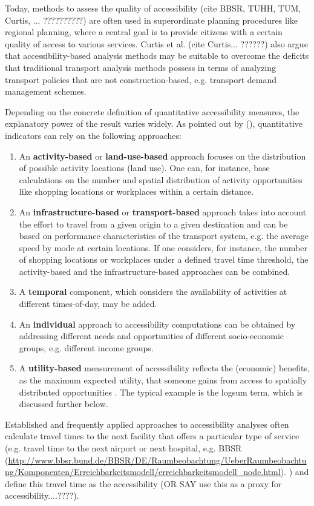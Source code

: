 Today, methods to assess the quality of accessibility (cite BBSR, TUHH, TUM, Curtis, ... ??????????) are often used in superordinate planning procedures like regional planning, where a central goal is to provide citizens with a certain quality of access to various services. Curtis et al. (cite Curtis... ??????) also argue that accessibility-based analysis methods may be suitable to overcome the deficits that traditional transport analysis methods possess in terms of analyzing transport policies that are not construction-based, e.g. transport demand management schemes.

Depending on the concrete definition of quantitative accessibility measures, the explanatory power of the result varies widely. As pointed out by \citet{GeursRitsema2001AccessibilityMeasures} (\citep[see also][]{Geurs2004AccessibilityReview}), quantitative indicators can rely on the following approaches:
%
\begin{enumerate}
\item An \textbf{activity-based} or \textbf{land-use-based} approach focuses on
the distribution of possible activity locations (land use). One can, for instance,
base calculations on the number and spatial distribution of activity opportunities
like shopping locations or workplaces within a certain distance.
%
\item An \textbf{in\-fra\-struc\-ture-based} or \textbf{transport-based} approach takes into account the effort to travel from a given origin to a given destination and 
can be based on performance characteristics of the transport system, e.g. the
average speed by mode at certain locations. If one considers, for instance, the
number of shopping locations or workplaces under a defined travel time threshold,
the activity-based and the infrastructure-based approaches can be combined.
%
\item A \textbf{temporal} component, which considers the availability of activities at different times-of-day, may be added.
%
\item An \textbf{individual} approach to accessibility computations can be
obtained by addressing different needs and opportunities of different socio-economic groups, e.g. different income groups.
%
\item A \textbf{utility-based} measurement of accessibility reflects the
(economic) benefits, as the maximum expected utility, that someone gains
from access to spatially distributed opportunities
\citep{GeursRitsema2001AccessibilityMeasures,deJongEtAl2007LogsumTRA}. The
typical example is the logsum term, which is discussed further below.
\end{enumerate}
%
%
Established and frequently applied approaches to accessibility analyses often calculate travel times to the next facility that offers a particular type of service (e.g. travel time to the next airport or next hospital, e.g. BBSR (\url{http://www.bbsr.bund.de/BBSR/DE/Raumbeobachtung/UeberRaumbeobachtung/Komponenten/Erreichbarkeitsmodell/erreichbarkeitsmodell_node.html}). ) and define this travel time as the accessibility (OR SAY use this as a proxy for accessibility....????).

